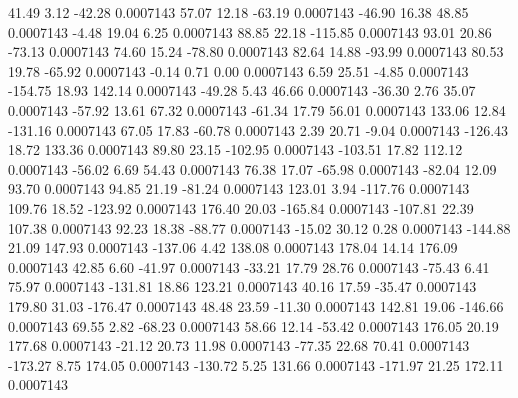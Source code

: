        41.49        3.12      -42.28     0.0007143
       57.07       12.18      -63.19     0.0007143
      -46.90       16.38       48.85     0.0007143
       -4.48       19.04        6.25     0.0007143
       88.85       22.18     -115.85     0.0007143
       93.01       20.86      -73.13     0.0007143
       74.60       15.24      -78.80     0.0007143
       82.64       14.88      -93.99     0.0007143
       80.53       19.78      -65.92     0.0007143
       -0.14        0.71        0.00     0.0007143
        6.59       25.51       -4.85     0.0007143
     -154.75       18.93      142.14     0.0007143
      -49.28        5.43       46.66     0.0007143
      -36.30        2.76       35.07     0.0007143
      -57.92       13.61       67.32     0.0007143
      -61.34       17.79       56.01     0.0007143
      133.06       12.84     -131.16     0.0007143
       67.05       17.83      -60.78     0.0007143
        2.39       20.71       -9.04     0.0007143
     -126.43       18.72      133.36     0.0007143
       89.80       23.15     -102.95     0.0007143
     -103.51       17.82      112.12     0.0007143
      -56.02        6.69       54.43     0.0007143
       76.38       17.07      -65.98     0.0007143
      -82.04       12.09       93.70     0.0007143
       94.85       21.19      -81.24     0.0007143
      123.01        3.94     -117.76     0.0007143
      109.76       18.52     -123.92     0.0007143
      176.40       20.03     -165.84     0.0007143
     -107.81       22.39      107.38     0.0007143
       92.23       18.38      -88.77     0.0007143
      -15.02       30.12        0.28     0.0007143
     -144.88       21.09      147.93     0.0007143
     -137.06        4.42      138.08     0.0007143
      178.04       14.14      176.09     0.0007143
       42.85        6.60      -41.97     0.0007143
      -33.21       17.79       28.76     0.0007143
      -75.43        6.41       75.97     0.0007143
     -131.81       18.86      123.21     0.0007143
       40.16       17.59      -35.47     0.0007143
      179.80       31.03     -176.47     0.0007143
       48.48       23.59      -11.30     0.0007143
      142.81       19.06     -146.66     0.0007143
       69.55        2.82      -68.23     0.0007143
       58.66       12.14      -53.42     0.0007143
      176.05       20.19      177.68     0.0007143
      -21.12       20.73       11.98     0.0007143
      -77.35       22.68       70.41     0.0007143
     -173.27        8.75      174.05     0.0007143
     -130.72        5.25      131.66     0.0007143
     -171.97       21.25      172.11     0.0007143
